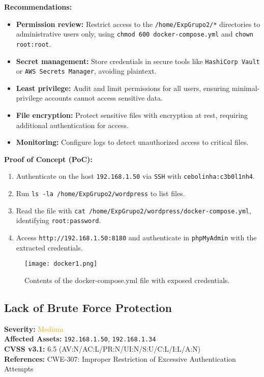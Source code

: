 \documentclass[a4paper,12pt]{article}
\begin{document}
\textbf{Recommendations:}  
\begin{itemize}
    \item \textbf{Permission review:} Restrict access to the \texttt{/home/ExpGrupo2/*} directories to administrative users only, using \texttt{chmod 600 docker-compose.yml} and \texttt{chown root:root}.  
    \item \textbf{Secret management:} Store credentials in secure tools like \texttt{HashiCorp Vault} or \texttt{AWS Secrets Manager}, avoiding plaintext.  
    \item \textbf{Least privilege:} Audit and limit permissions for all users, ensuring minimal-privilege accounts cannot access sensitive data.  
    \item \textbf{File encryption:} Protect sensitive files with encryption at rest, requiring additional authentication for access.  
    \item \textbf{Monitoring:} Configure logs to detect unauthorized access to critical files.  
\end{itemize}

\textbf{Proof of Concept (PoC):}  
\begin{enumerate}
    \item Authenticate on the host \texttt{192.168.1.50} via \texttt{SSH} with \texttt{cebolinha:c3b0l1nh4}.  
    \item Run \texttt{ls -la /home/ExpGrupo2/wordpress} to list files.  
    \item Read the file with \texttt{cat /home/ExpGrupo2/wordpress/docker-compose.yml}, identifying \texttt{root:password}.  
    \item Access \texttt{http://192.168.1.50:8180} and authenticate in \texttt{phpMyAdmin} with the extracted credentials.  
\end{enumerate}

\begin{figure}[H]
    \centering
    \texttt{[image: docker1.png]}
    \caption{Contents of the docker-compose.yml file with exposed credentials.}
\end{figure}

\clearpage

\subsection{Lack of Brute Force Protection}
\textbf{Severity:} \textcolor{Orange}{Medium} \\
\textbf{Affected Assets:} \texttt{192.168.1.50}, \texttt{192.168.1.34} \\
\textbf{CVSS v3.1:} 6.5 (AV:N/AC:L/PR:N/UI:N/S:U/C:L/I:L/A:N) \\
\textbf{References:} CWE-307: Improper Restriction of Excessive Authentication Attempts
\end{document}
